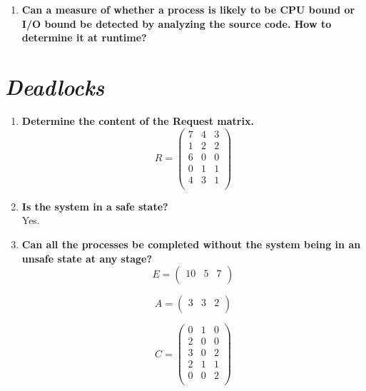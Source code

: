 \documentclass{article}
\begin{document}
\begin{spacing}{1.5}
\begin{enumerate}
	\item\textbf{Can a measure of whether a process is likely to be CPU bound or I/O bound be detected by analyzing the source code. How to determine it at runtime?}\\

\end{enumerate}
\section{\textit{Deadlocks}}
\begin{enumerate}
	\item\textbf{Determine the content of the Request matrix.}\\
	\begin{equation}
	R=\left(           
  	\begin{array}{ccc}
    7 & 4 & 3\\
    1 & 2 & 2\\
    6 & 0 & 0\\
    0 & 1 & 1\\
    4 & 3 & 1\\
  	\end{array}
	\right)
	\end{equation}
	\item\textbf{Is the system in a safe state?}\\
	Yes.
	\item\textbf{Can all the processes be completed without the system being in an unsafe state at any stage?}
	\begin{equation}
	E=\left(           
  	\begin{array}{ccc}
    10 & 5 & 7\\
  	\end{array}
	\right)
	\end{equation}

	\begin{equation}
	A=\left(           
  	\begin{array}{ccc}
    3 & 3 & 2\\
  	\end{array}
	\right)
	\end{equation}

	\begin{equation}
	C=\left(           
  	\begin{array}{ccc}
    0 & 1 & 0\\
    2 & 0 & 0\\
    3 & 0 & 2\\
    2 & 1 & 1\\
    0 & 0 & 2\\
  	\end{array}
	\right)
	\end{equation}


\end{enumerate}
\end{spacing}
\end{document}
